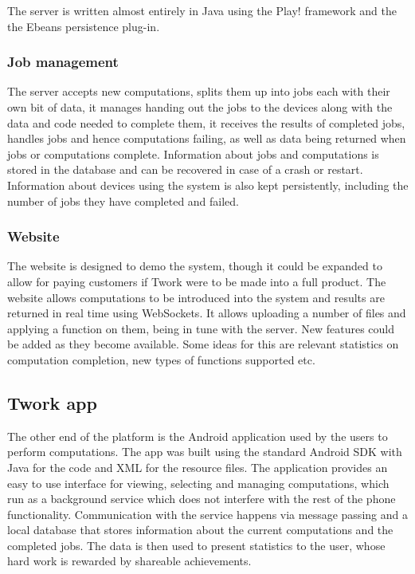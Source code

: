 \documentclass[a4paper,10pt]{article}
\begin{document}
The server is written almost entirely in Java using the Play! framework and the the Ebeans persistence plug-in.

\subsubsection{Job management}
The server accepts new computations, splits them up into jobs each with their own bit of data, it manages handing out the jobs to the devices along with
the data and code needed to complete them, it receives the results of completed jobs, handles jobs and hence computations failing, as well
as data being returned when jobs or computations complete.
Information about jobs and computations is stored in the database and can be recovered
in case of a crash or restart.
Information about devices using the system is also kept persistently, including the number of jobs they have completed and failed.

\subsubsection{Website}


The website is designed to demo the system, though it could be expanded to allow for paying customers if Twork were to be made into a full product.
The website allows computations to be introduced into the system and results are returned in real time using WebSockets. It allows uploading a number of files and applying a function on them, being in tune with the server. New features could be added as they become available. Some ideas for this are relevant statistics on computation completion, new types of functions supported etc.


\subsection{Twork app}
The other end of the platform is the Android application used by the users to perform computations. The app was built using the standard Android SDK with Java for the code and XML for the resource files. The application provides an easy to use interface for viewing, selecting and managing computations, which run as a background service which does not interfere with the rest of the phone functionality. Communication with the service happens via message passing and a local database that stores information about the current computations and the completed jobs. The data is then used to present statistics to the user, whose hard work is rewarded by shareable achievements. 
\end{document}
